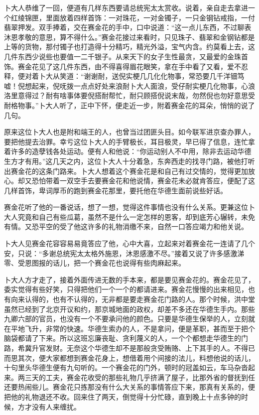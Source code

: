 \documentclass[12pt,UTF8]{ctexbook}
\begin{document}
{{{卜大人恭维了一回，便道有几样东西要请总统宪太太赏收。说着，亲自走去拿进一个红绫锦匣，里面放着四样首饰：一对珠花，一对金镯子，一只金钢钻戒指，一付翡翠押发。双手捧着，交在赛金花的手中，口中说道：“这一点儿东西，不过聊表沐恩孝敬的意思，算不得什么。”赛金花接过来看时，只见珠子、翡翠和金钢钻都是上等的货物，那付镯子也打造得十分精巧，精光外溢，宝气内含。约莫看上去，这几件东西少说些也要值一二千银子。从来天下的女子生性最贪，又最爱的金珠首饰。赛金花见了这几件东西，由不得喜得眉花眼笑，拿在手中看了又看，爱不忍释，便对着卜大从笑道：“谢谢耐，送倪实梗几几化化物事，常恐要几千洋钿笃嘘！倪想起来，倪呒拨一点点好处来浪耐卜大人面浪，受仔耐实梗几化物事，心浪洛里意得过？耐有啥事体要倪搭耐帮忙，耐只顾搭倪说末哉，勿然倪也勿好意思受耐格物事。”卜大人听了，正中下怀，便走近一步，附着赛金花的耳朵，悄悄的说了几句。

原来这位卜大人也是附和端王的人，也曾当过团匪头目。如今联军进京查办罪人，要把他提去治罪。幸亏这位卜大人的手臂极长，耳目极灵，早已得了信息，连忙拿着许多的造孽钱各处运动。便有人和他说：“你运动别人不中用，除非去运动华德生方才有用。”这几天之内，这位卜大人十分着急，东奔西走的找寻门路，被他打听出赛金花的这条门路来。卜大人想着这个赛金花是和自己有过交情的，觉得更加放心。却又恐怕带着一双空手去要赛金花和他说情，赛金花未必就肯答应，便配了这几样首饰，卑词厚币的跑到赛金花那里，要托他在华德生面前说些好话。

赛金花听了他的一番说话，想了一想，觉得这件事情也没有什么关系。更兼这位卜大人究竟和自己有些瓜葛，虽然不是什么一定怎样的恩客，却到底芳心辗转，未免有情。又恐平空的受了他这许多的礼物消缴不来，自然一口答应竭力和他关说。

卜大人见赛金花容容易易竟答应了他，心中大喜，立起来对着赛金花一连请了几个安，只说：“多谢总统宪太太格外施恩，沐恩感激不尽。”接着又说了许多感激涕零、受恩图报的话儿，把一个赛金花也说得有些肉麻起来。

卜大人方才走了，接着外面传进无数的手本来，都是要见赛金花的。赛金花见了，委实觉得有些好笑，只得把他们一个一个的都请进来。赛金花慢慢的出来相见，也有向来认得的，也有不认得的，无非都是要走赛金花门路的人。那个时候，洪中堂虽然已经到了北京开议和约，那京城地面的政权，却差不多还在华德生手内。那些九卿六部的官员，也没有一个不要承问他的颜色。只要是华德生保举的人，立刻就在平地飞升，非常的快速。华德生索办的人，不是拿问，便是革职，甚而至于把个脑袋都请了下来。所以这班忘廉丧耻、贪利蔑义的人，一个个都想走华德生的门路，希冀升官发财。无奈这个华德生却不是那般贪受贿赂、上下其手的人。不得已而思其次，便大家都想到赛金花身上，想借着用个间接的法儿，料想他说的话儿，十句里头华德生便有九句听的。一个赛金花的门外，顿时的冠盖如云，车马杂沓起来。两三天的工夫，赛金花收受的那些礼物几乎挤满了屋子，比那外省的督抚到任还要热闹些儿。赛金花只拣那没有什么大关系的事情答应下来，那真有关系的，便把他的礼物退还不收。回来住了两天，倒觉得十分忙碌，直到晚上十点多钟的时候，方才没有人来缠扰。

}}}
\end{document}
